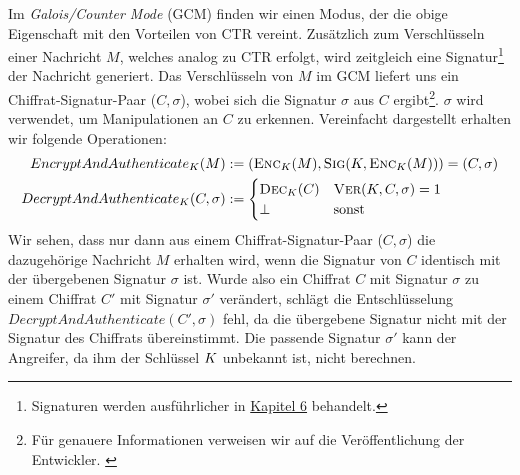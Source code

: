 Im \textit{Galois/Counter Mode} (GCM) finden wir einen Modus, der die obige Eigenschaft mit den Vorteilen von CTR vereint. Zusätzlich zum Verschlüsseln einer Nachricht $M$, welches analog zu CTR erfolgt, wird zeitgleich eine Signatur\footnote{Signaturen werden ausführlicher in \hyperref[cha6]{Kapitel 6} behandelt.} der Nachricht generiert. Das Verschlüsseln von $M$ im GCM liefert uns ein Chiffrat-Signatur-Paar ($C, \sigma$), wobei sich die Signatur $\sigma$ aus $C$ ergibt\footnote{Für genauere Informationen verweisen wir auf die Veröffentlichung der Entwickler. \cite{NIST_GCM05}}. 
$\sigma$ wird verwendet, um Manipulationen an $C$ zu erkennen. Vereinfacht dargestellt erhalten wir folgende Operationen:
\begin{align*}
	EncryptAndAuthenticate_{K}(M) &:= (\textsc{Enc}_{K}(M), \textsc{Sig}(K, \textsc{Enc}_{K}(M))) = (C, \sigma)\\
	DecryptAndAuthenticate_{K}(C, \sigma) &:= \begin{cases}
		\textsc{Dec}_{K}(C) & \textsc{Ver}(K, C, \sigma) = 1 \\
		\bot & \text{sonst}
	\end{cases}
\end{align*}
Wir sehen, dass nur dann aus einem Chiffrat-Signatur-Paar ($C, \sigma$) die dazugehörige Nachricht $M$ erhalten wird, wenn die Signatur von $C$ identisch mit der übergebenen Signatur $\sigma$ ist. Wurde also ein Chiffrat $C$ mit Signatur $\sigma$ zu einem Chiffrat $C'$ mit Signatur $\sigma'$ verändert, schlägt die Entschlüsselung $DecryptAndAuthenticate(C', \sigma)$ fehl, da die übergebene Signatur nicht mit der Signatur des Chiffrats übereinstimmt. Die passende Signatur $\sigma'$ kann der Angreifer, da ihm der Schlüssel $K$ unbekannt ist, nicht berechnen.


